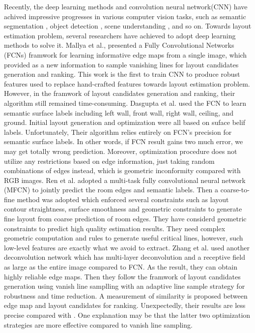 Recently, the deep learning methods and convolution neural network(CNN) have achived impressive progresses in various computer vision tasks, such as semantic segmentation \cite{long2015fully}\cite{chen2016deeplab}, object detection \cite{girshick2015fast}\cite{ren2015faster}, scene understanding \cite{gupta2015indoor}\cite{badrinarayanan2017segnet}, and so on. Towards layout estimation problem, several researchers have achieved to adopt deep learning methods to solve it. Mallya et al.\cite{mallya2015learning}, presented a Fully Convolutional Networks (FCNs)\cite{long2015fully} framwork for learning informative edge maps from a single image, which provided as a new information to sample vanishing lines for layout candidates generation and ranking. This work is the first to train CNN to produce robust features used to replace hand-crafted features towards layout estimation problem. However, in the framwork of layout candidates generation and ranking, their algorithm still remained time-consuming. Dasgupta et al.\cite{dasgupta2016delay} used the FCN to learn semantic surface labels including left wall, front wall, right wall, ceiling, and ground. Initial layout generation and optimization were all based on suface belif labels. Unfortunately, Their algorithm relies entirely on FCN's precision for semantic surface labels. In other words, if FCN result gains two much error, we may get totally wrong prediction. Moreover, optimization procedure does not utilize any restrictions based on edge information, just taking random combinations of edges instead, which is geometric inconformity compared with RGB images. Ren et al.\cite{ren2016coarse} adopted a multi-task fully convolutional neural network (MFCN) to jointly predict the room edges and semantic labels. Then a coarse-to-fine method was adopted which enforced several constraints such as layout contour straightness, surface smoothness and geometric constraints to generate fine layout from coarse prediction of room edges. They have considerd geometric constraints to predict high quality estimation results. They need complex geometric computation and rules to generate useful critical lines, however, such low-level features are exactly what we avoid to extract. Zhang et al.\cite{zhang2016learning} used another deconvolution network which has multi-layer deconvolution and a receptive field as large as the entire image compared to FCN. As the result, they can obtain highly reliable edge maps. Then they follow the framwork of layout candidates generation using vanish line samplling with an adaptive line sample strategy for robustness and time reduction. A measurement of similarity is proposed between edge map and layout candidates for ranking. Unexpectedly, their results are less precise compared with \cite{dasgupta2016delay}\cite{ren2016coarse}. One explanation may be that the latter two optimization strategies are more effective compared to vanish line sampling.


